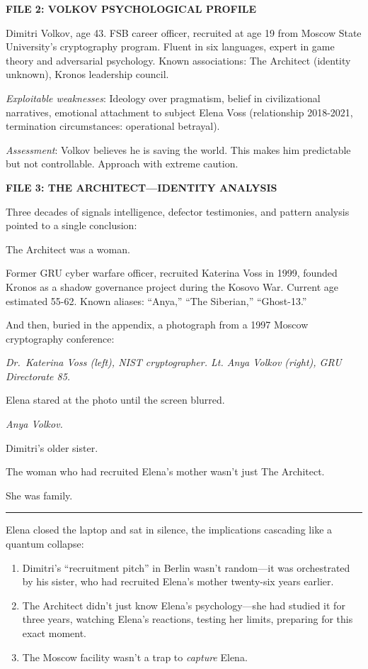 \documentclass[12pt,letterpaper]{book}
\begin{document}
\textbf{FILE 2: VOLKOV PSYCHOLOGICAL PROFILE}

Dimitri Volkov, age 43. FSB career officer, recruited at age 19 from Moscow State University's cryptography program. Fluent in six languages, expert in game theory and adversarial psychology. Known associations: The Architect (identity unknown), Kronos leadership council.

\emph{Exploitable weaknesses}: Ideology over pragmatism, belief in civilizational narratives, emotional attachment to subject Elena Voss (relationship 2018-2021, termination circumstances: operational betrayal).

\emph{Assessment}: Volkov believes he is saving the world. This makes him predictable but not controllable. Approach with extreme caution.

\textbf{FILE 3: THE ARCHITECT---IDENTITY ANALYSIS}

Three decades of signals intelligence, defector testimonies, and pattern analysis pointed to a single conclusion:

The Architect was a woman.

Former GRU cyber warfare officer, recruited Katerina Voss in 1999, founded Kronos as a shadow governance project during the Kosovo War. Current age estimated 55-62. Known aliases: ``Anya,'' ``The Siberian,'' ``Ghost-13.''

And then, buried in the appendix, a photograph from a 1997 Moscow cryptography conference:

\emph{Dr.~Katerina Voss (left), NIST cryptographer. Lt. Anya Volkov (right), GRU Directorate 85.}

Elena stared at the photo until the screen blurred.

\emph{Anya Volkov.}

Dimitri's older sister.

The woman who had recruited Elena's mother wasn't just The Architect.

She was family.

\begin{center}\rule{0.5\linewidth}{0.5pt}\end{center}

Elena closed the laptop and sat in silence, the implications cascading like a quantum collapse:

\begin{enumerate}
\def\labelenumi{\arabic{enumi}.}
\item
  Dimitri's ``recruitment pitch'' in Berlin wasn't random---it was orchestrated by his sister, who had recruited Elena's mother twenty-six years earlier.
\item
  The Architect didn't just know Elena's psychology---she had studied it for three years, watching Elena's reactions, testing her limits, preparing for this exact moment.
\item
  The Moscow facility wasn't a trap to \emph{capture} Elena.
\end{enumerate}
\end{document}
